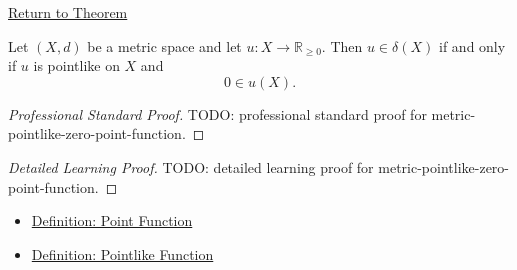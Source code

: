 \newpage
{}
\label{prf:metric-pointlike-zero-point-function}

\begin{remark*}[Return]
\hyperref[thm:metric-pointlike-zero-point-function]{Return to Theorem}
\end{remark*}

\begin{theorem*}
Let \((X,d)\) be a metric space and let \(u:X\to\mathbb{R}_{\geq 0}\).  Then
\(u\in\delta(X)\) if and only if \(u\) is pointlike on \(X\) and
\[
  0\in u(X).
\]
\end{theorem*}

\begin{proof}[Professional Standard Proof]
\LRAProofBodyStart
TODO: professional standard proof for metric-pointlike-zero-point-function.
\end{proof}

\begin{proof}[Detailed Learning Proof]
\LRAProofBodyStart
TODO: detailed learning proof for metric-pointlike-zero-point-function.
\end{proof}

\begin{remark*}
\end{remark*}

\begin{dependencies}
\begin{itemize}
  \item \hyperref[def:metric-point-function]{Definition: Point Function}
  \item \hyperref[def:metric-pointlike-function]{Definition: Pointlike Function}
\end{itemize}
\end{dependencies}

\clearpage
